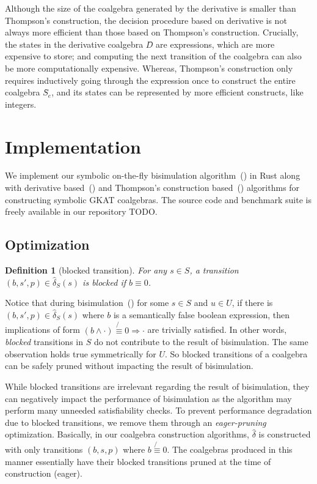 \documentclass[conference]{IEEEtran}
\newtheorem{definition}{Definition}
\begin{document}
Although the size of the coalgebra generated by the derivative is smaller than Thompson's construction, the decision procedure based on derivative is not always more efficient than those based on Thompson's construction. 
Crucially, the states in the derivative coalgebra \(D̂\) are expressions, which are more expensive to store; and computing the next transition of the coalgebra can also be more computationally expensive.
Whereas, Thompson's construction only requires inductively going through the expression once to construct the entire coalgebra \(Ŝ_{e}\), and its states can be represented by more efficient constructs, like integers. 

\section{Implementation}
We implement our symbolic on-the-fly bisimulation algorithm~() in Rust along with derivative based~() and Thompson's construction based~() algorithms for constructing symbolic GKAT coalgebras. The source code and benchmark suite is freely available in our repository TODO.

\subsection{Optimization}\label{sec:optimization-implementation}
\begin{definition}[blocked transition]
    For any \(s \in S\), a transition \((b, s', p) \in \hat{\delta}_S(s)\) is blocked if \(b \equiv 0\).
\end{definition}

Notice that during bisimulation~() for some \(s \in S\) and \(u \in U\), if there is \((b,s',p) \in \hat{\delta}_S(s)\) where \(b\) is a semantically false boolean expression, then implications of form \((b \land \cdot) \not{\equiv} 0 \Rightarrow \cdot\) are trivially satisfied. In other words, \textit{blocked} transitions in \(S\) do not contribute to the result of bisimulation. The same observation holds true symmetrically for \(U\). So blocked transitions of a coalgebra can be safely pruned without impacting the result of bisimulation.

While blocked transitions are irrelevant regarding the result of bisimulation, they can negatively impact the performance of bisimulation as the algorithm may perform many unneeded satisfiability checks. To prevent performance degradation due to blocked transitions, we remove them through an \textit{eager-pruning} optimization. Basically, in our coalgebra construction algorithms, \(\hat{\delta}\) is constructed with only transitions \((b, s, p)\) where \(b \not{\equiv} 0\). The coalgebras produced in this manner essentially have their blocked transitions pruned at the time of construction (eager). 
\end{document}
